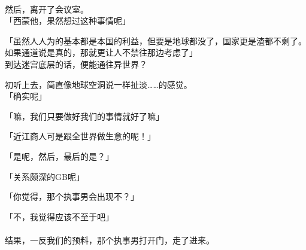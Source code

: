 \\

然后，离开了会议室。\\

「西蒙他，果然想过这种事情呢」

「虽然人人为的基本都是本国的利益，但要是地球都没了，国家更是渣都不剩了。如果通道说是真的，那就更让人不禁往那边考虑了」\\

到达迷宫底层的话，便能通往异世界？

初听上去，简直像地球空洞说一样扯淡……的感觉。\\

「确实呢」

「嘛，我们只要做好我们的事情就好了嘛」

「近江商人可是跟全世界做生意的呢！」

「是呢，然后，最后的是？」

「关系颇深的GB呢」

「你觉得，那个执事男会出现不？」

「不，我觉得应该不至于吧」\\

\sqsplit\\

结果，一反我们的预料，那个执事男打开门，走了进来。\\

\\

